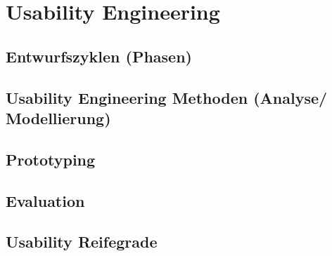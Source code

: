 \documentclass[a4paper]{article}
\title{\docTitle}
\author{Moritz}
\date{\today}
\begin{document}
\maketitle
\tableofcontents


\section{Usability Engineering}

\subsection{Entwurfszyklen (Phasen)}

\subsection{Usability Engineering Methoden (Analyse/ Modellierung)}

\subsection{Prototyping}

\subsection{Evaluation}

\subsection{Usability Reifegrade}
\end{document}
